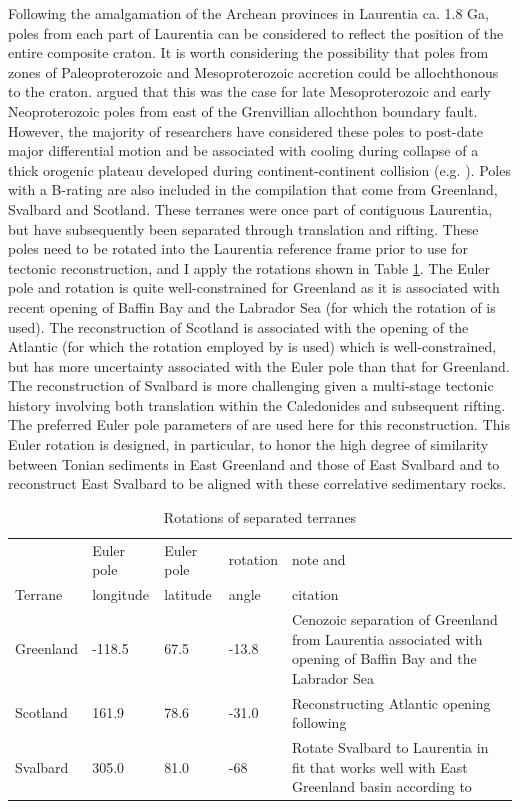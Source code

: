 \documentclass[twocolumn, switch]{article} %
\begin{document}
Following the amalgamation of the Archean provinces in Laurentia ca. 1.8 Ga, poles from each part of Laurentia can be considered to reflect the position of the entire composite craton. It is worth considering the possibility that poles from zones of Paleoproterozoic and Mesoproterozoic accretion could be allochthonous to the craton. \cite{Halls2015b} argued that this was the case for late Mesoproterozoic and early Neoproterozoic poles from east of the Grenvillian allochthon boundary fault. However, the majority of researchers have considered these poles to post-date major differential motion and be associated with cooling during collapse of a thick orogenic plateau developed during continent-continent collision (e.g. \citealp{Brown2012a}). Poles with a B-rating are also included in the compilation that come from Greenland, Svalbard and Scotland. These terranes were once part of contiguous Laurentia, but have subsequently been separated through translation and rifting. These poles need to be rotated into the Laurentia reference frame prior to use for tectonic reconstruction, and I apply the rotations shown in Table \ref{tab:terrane_rotations}. The Euler pole and rotation is quite well-constrained for Greenland as it is associated with recent opening of Baffin Bay and the Labrador Sea (for which the rotation of \citealp{Roest1989a} is used). The reconstruction of Scotland is associated with the opening of the Atlantic (for which the rotation employed by \citealp{Torsvik2017a} is used) which is well-constrained, but has more uncertainty associated with the Euler pole than that for Greenland. The reconstruction of Svalbard is more challenging given a multi-stage tectonic history involving both translation within the Caledonides and subsequent rifting. The preferred Euler pole parameters of \cite{Maloof2006a} are used here for this reconstruction. This Euler rotation is designed, in particular, to honor the high degree of similarity between Tonian sediments in East Greenland and those of East Svalbard \citep{Maloof2006a, Hoffman2012a} and to reconstruct East Svalbard to be aligned with these correlative sedimentary rocks.

\begin{table}[hbt]
\caption{Rotations of separated terranes}
{\scriptsize
\begin{tabular}{|l|l|l|l|p{1.1 in}|}
  \hline
& Euler pole & Euler pole & rotation & note and \\
Terrane & longitude & latitude & angle & citation \\
\hline
Greenland & -118.5 & 67.5 & -13.8 & Cenozoic separation of Greenland from Laurentia associated with opening of Baffin Bay and the Labrador Sea \citep{Roest1989a} \\
\hline
Scotland & 161.9 & 78.6 & -31.0 & Reconstructing Atlantic opening following \cite{Torsvik2017a} \\
\hline
Svalbard & 305.0 & 81.0 & -68 & Rotate Svalbard to Laurentia in fit that works well with East Greenland basin according to \cite{Maloof2006a}\\
\hline
\end{tabular}
}
\label{tab:terrane_rotations}
\end{table}
\end{document}
